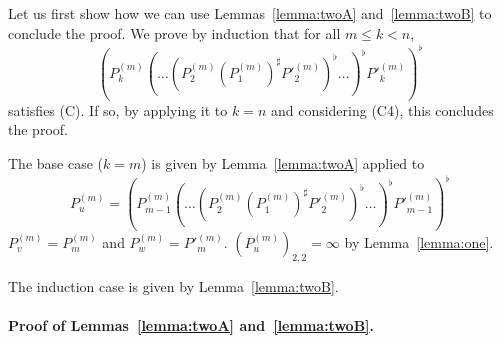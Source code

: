 \documentclass{lmcs}
\theoremstyle{remark}
\theoremstyle{remark}
\begin{document}
Let us first show how we can use Lemmas~\ref{lemma:twoA} and~\ref{lemma:twoB} to conclude the proof. We prove by induction that for all $m \leq k < n$, 
$$(P^{(m)}_{k} (\ldots (P^{(m)}_2 (P^{(m)}_1)^\sharp P'^{(m)}_2)^\flat \ldots)^\flat P'^{(m)}_{k})^\flat$$
satisfies (C). If so, by applying it to $k=n$ and considering (C4), this concludes the proof.

The base case ($k=m$) is given by Lemma~\ref{lemma:twoA} applied to 
$$P^{(m)}_u = (P^{(m)}_{m-1} (\ldots (P^{(m)}_2 (P^{(m)}_1)^\sharp P'^{(m)}_2)^\flat \ldots)^\flat P'^{(m)}_{m-1})^\flat$$
$P^{(m)}_v = P^{(m)}_m$ and $P^{(m)}_w = P'^{(m)}_m$. $(P^{(m)}_u)_{2,2} = \infty$ by Lemma~\ref{lemma:one}.

The induction case is given by Lemma~\ref{lemma:twoB}. 

\paragraph{Proof of Lemmas~\ref{lemma:twoA} and~\ref{lemma:twoB}.}
\end{document}
